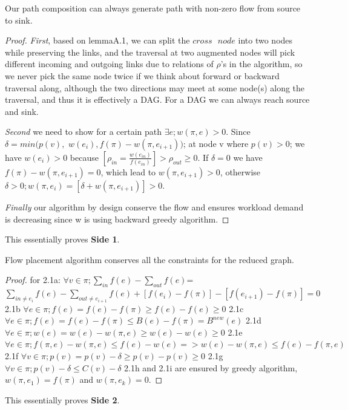 \documentclass[twoside,leqno, 11pt]{article}
\begin{document}
\begin{theorem}Our path composition can always generate path with non-zero flow from source to sink. \end{theorem}
\begin{proof}
\textit{First}, based on lemmaA.1, we can split the $cross\text{ } node$ into two nodes while preserving the links, and the traversal at two augmented nodes will pick different incoming and outgoing links due to relations of $\rho$'s  in the algorithm, so we never pick the same node twice if we think about forward or backward traversal along, although the two directions may meet at some node(s) along the traversal, and thus it is effectively a DAG. For a DAG we can always reach source and sink.

\textit{Second} we need to show for a certain path $\exists e; w(\pi, e)>0$. Since $\delta = min( p(v),$ $w(e_{i}),f(\pi) -w(\pi,e_{i+1}))$; at node v where $p(v)>0$; we have $w(e_i)>0$ because $[\rho_{in} =\frac{ w(e_{in})}{f(e_{in})} ]>\rho_{out}\geq 0$. If $\delta=0$ we have $ f(\pi) -w(\pi,e_{i+1}) =0$, which lead to $ w(\pi, e_{i+1})>0$, otherwise $ \delta>0;w(\pi, e_i) = [ \delta+w(\pi, e_{i+1} )]>0$.

\textit{Finally} our algorithm by design conserve the flow and ensures workload demand is decreasing since w is using backward greedy algorithm.
\end{proof}

This essentially proves \textbf{Side 1}.

\begin{theorem}Flow placement algorithm conserves all the constraints for the reduced graph.
\end{theorem}
\begin{proof}
for 2.1a:\newline
$\forall v \in \pi; \sum\limits_{in}  f(e) - \sum\limits_{out} f(e)$=
\newline$\sum\limits_{in \not=e_i}  f(e) - \sum\limits_{out\not=e_{i+1} } f(e) +[f(e_i)-f(\pi) ] - [f(e_{i+1}) -f(\pi)] = 0 $
\newline
2.1b\newline
$ \forall e \in \pi; f(e) = f(e)-f(\pi) \geq f(e)-f(e) \geq 0$\newline
2.1c\newline
$\forall e \in \pi; f(e) = f(e)-f(\pi) \leq B(e)-f(\pi)=B^{new}(e)$\newline
2.1d\newline
$\forall e \in \pi; w(e) = w(e) - w(\pi, e) \geq w(e) -w(e) \geq 0$\newline
2.1e\newline
$\forall e \in\pi; f(\pi, e)-w(\pi, e) \leq f(e) -w(e) =>w(e) -w(\pi, e) \leq f(e) -f(\pi, e) $\newline
2.1f\newline
$\forall v \in \pi; p(v) = p(v) -\delta \geq p(v) -p(v) \geq 0 $\newline
2.1g\newline
$\forall v \in \pi; p(v) - \delta \leq C(v) - \delta $\newline
2.1h and 2.1i are ensured by greedy algorithm, $w(\pi, e_1) = f(\pi) $ and $w(\pi, e_k)=0$.
\end{proof}
This essentially proves \textbf{Side 2}.
\end{document}
